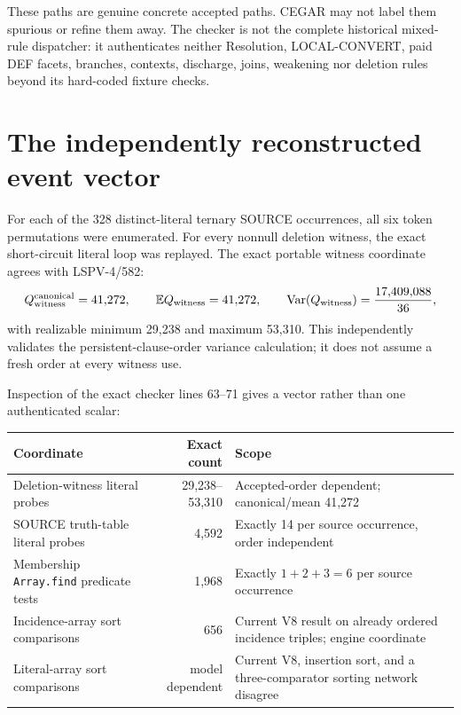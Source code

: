 \documentclass[11pt]{article}
\begin{document}
These paths are genuine concrete accepted paths.  CEGAR may not label them spurious or refine them away.  The checker is not the complete historical mixed-rule dispatcher: it authenticates neither Resolution, LOCAL-CONVERT, paid DEF facets, branches, contexts, discharge, joins, weakening nor deletion rules beyond its hard-coded fixture checks.

\section*{The independently reconstructed event vector}
For each of the 328 distinct-literal ternary SOURCE occurrences, all six token permutations were enumerated.  For every nonnull deletion witness, the exact short-circuit literal loop was replayed.  The exact portable witness coordinate agrees with LSPV-4/582:
\[
 Q_{\rm witness}^{\rm canonical}=41{,}272,
 \qquad \mathbb E Q_{\rm witness}=41{,}272,
 \qquad \operatorname{Var}(Q_{\rm witness})=\frac{17{,}409{,}088}{36},
\]
with realizable minimum 29,238 and maximum 53,310.  This independently validates the persistent-clause-order variance calculation; it does not assume a fresh order at every witness use.

Inspection of the exact checker lines 63--71 gives a vector rather than one authenticated scalar:
\begin{center}
\begin{tabular}{@{}lrp{.48\linewidth}@{}}
\toprule
Coordinate & Exact count & Scope\\
\midrule
Deletion-witness literal probes & 29,238--53,310 & Accepted-order dependent; canonical/mean 41,272\\
SOURCE truth-table literal probes & 4,592 & Exactly 14 per source occurrence, order independent\\
Membership \texttt{Array.find} predicate tests & 1,968 & Exactly $1+2+3=6$ per source occurrence\\
Incidence-array sort comparisons & 656 & Current V8 result on already ordered incidence triples; engine coordinate\\
Literal-array sort comparisons & model dependent & Current V8, insertion sort, and a three-comparator sorting network disagree\\
\bottomrule
\end{tabular}
\end{center}
\end{document}
